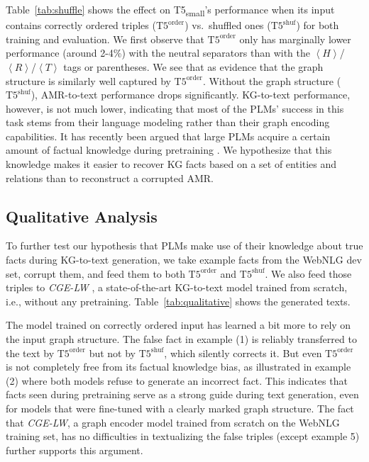 \documentclass[11pt,a4paper]{article}
\newcommand{\ourtag}[1]{\ensuremath{\left\langle #1 \right\rangle}}
\newcommand{\shufmodel}[3]{\ensuremath{\text{#1}^{\text{#3}}}}
\begin{document}
\begin{table*}[t]
Table~\ref{tab:shuffle} shows the effect on T5\textsubscript{small}'s performance when its input contains correctly ordered triples (\shufmodel{T5}{small}{order}) vs.\ shuffled ones (\shufmodel{T5}{small}{shuf}) for both training and evaluation.
We first observe that \shufmodel{T5}{small}{order} only has marginally lower performance (around 2-4\%{}) with the neutral separators than with the \ourtag{H}/\ourtag{R}/\ourtag{T} tags or parentheses. We see that as evidence that the graph structure is similarly well captured by \shufmodel{T5}{small}{order}.
Without the graph structure (\shufmodel{T5}{small}{shuf}), AMR-to-text performance drops significantly.  KG-to-text performance, however, is not much lower,
indicating that most of the PLMs' success in this task stems from their language modeling rather than their graph encoding capabilities.
It has recently been argued that large PLMs acquire a certain amount of factual knowledge during pretraining \citep{petroni-etal-2019-language}.
We hypothesize that this knowledge makes it easier to recover KG facts based on a set of entities and relations than to reconstruct a corrupted AMR.






\subsection{Qualitative Analysis}
\label{sec:qualitative}

To further test our hypothesis that
PLMs make use of their knowledge about true facts
during KG-to-text generation, we take example facts from the WebNLG dev set, corrupt them, and feed them to both \shufmodel{T5}{small}{order} and \shufmodel{T5}{small}{shuf}. We also feed those triples to \emph{CGE-LW} \cite{ribeiro2020modeling}, a state-of-the-art KG-to-text model trained from scratch, i.e., without any pretraining. Table~\ref{tab:qualitative} shows the generated texts.

The model trained on correctly ordered input has learned a bit more to rely on the input graph structure. The false fact in example (1) is reliably transferred to the text by \shufmodel{T5}{small}{order} but not by \shufmodel{T5}{small}{shuf}, which silently corrects it. But even \shufmodel{T5}{small}{order} is not completely free from its factual knowledge bias,
as illustrated in example (2) where both models refuse to generate an incorrect fact.
This indicates that facts seen during pretraining serve as a strong guide during text generation, even for models that were fine-tuned with a clearly marked graph structure.
The fact that \emph{CGE-LW}, a graph encoder model trained from scratch on the WebNLG training set, has no difficulties in textualizing the false triples (except example 5) further supports this argument.


\end{table*}
\end{document}

